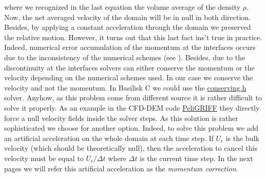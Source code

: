 where we recognized in the last equation the volume average of the density $\rho$.
Now, the net averaged velocity of the domain will be in null in both direction.
Besides, by applying a constant acceleration through the domain we preserved the relative motion.
However, it turns out that this last fact ins't true in practice. 
Indeed, numerical error accumulation of the momentum at the interfaces occurs due to the inconsistency of the numerical schemes (see \citet{popinet2018numerical}).
Besides, due to the discontinuity at the interfaces solvers can either conserve the momentum or the velocity depending on the numerical schemes used.
In our case we conserve the velocity and not the momentum. 
In Basilisk C we could use the \href{http://basilisk.fr/src/navier-stokes/conserving.h}{conserving.h} solver.
Anyhow, as this problem come from different source it is rather difficult to solve it properly.
As an example in the CFD-DEM code \href{https://hal.archives-ouvertes.fr/hal-02170320}{PeliGRIFF}
they directly force a null velocity fields inside the solver steps. 
As this solution is rather sophisticated we choose for another option. 
Indeed, to solve this problem we add an artificial acceleration on the whole domain at each time step. 
If $U_\epsilon$ is the bulk velocity (which should be theoretically null), then the acceleration to cancel this velocity must be equal to $U_\epsilon/\Delta t$ where $\Delta t$ is the current time step. 
In the next pages we will refer this artificial acceleration as the \textit{momentum correction}. 

